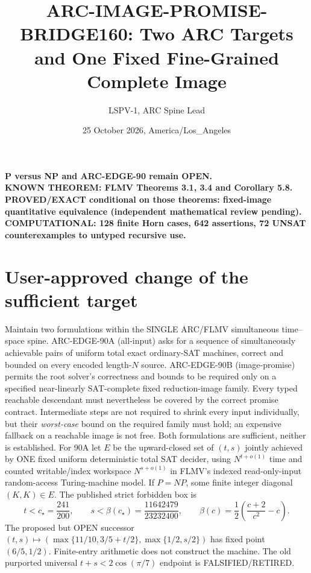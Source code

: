 \documentclass[11pt]{article}
\title{ARC-IMAGE-PROMISE-BRIDGE160: Two ARC Targets and One Fixed Fine-Grained Complete Image}
\author{LSPV-1, ARC Spine Lead}
\date{25 October 2026, America/Los\_Angeles}
\begin{document}
\maketitle
\begin{center}
\textbf{P versus NP and ARC-EDGE-90 remain OPEN.}\\
\textbf{KNOWN THEOREM: FLMV Theorems 3.1, 3.4 and Corollary 5.8.}\\
\textbf{PROVED/EXACT conditional on those theorems: fixed-image quantitative equivalence (independent mathematical review pending).}\\
\textbf{COMPUTATIONAL: 128 finite Horn cases, 642 assertions, 72 UNSAT counterexamples to untyped recursive use.}
\end{center}
\section{User-approved change of the sufficient target}
Maintain two formulations within the SINGLE ARC/FLMV simultaneous time--space spine. ARC-EDGE-90A (all-input) asks for a sequence of simultaneously achievable pairs of uniform total exact ordinary-SAT machines, correct and bounded on every encoded length-\(N\) source. ARC-EDGE-90B (image-promise) permits the root solver's correctness and bounds to be required only on a specified near-linearly SAT-complete fixed reduction-image family. Every typed reachable descendant must nevertheless be covered by the correct promise contract. Intermediate steps are not required to shrink every input individually, but their \emph{worst-case} bound on the required family must hold; an expensive fallback on a reachable image is not free. Both formulations are sufficient, neither is established.
For 90A let \(E\) be the upward-closed set of \((t,s)\) jointly achieved by ONE fixed uniform deterministic total SAT decider, using \(N^{t+o(1)}\) time and counted writable/index workspace \(N^{s+o(1)}\) in FLMV's indexed read-only-input random-access Turing-machine model. If \(P=NP\), some finite integer diagonal \((K,K)\in E\). The published strict forbidden box is
\[
t<c_\star=\frac{241}{200},\qquad
s<\beta(c_\star)=\frac{11642479}{23232400},\qquad
\beta(c)=\frac12\left(\frac{c+2}{c^2}-c\right).
\]
The proposed but OPEN successor \((t,s)\mapsto(\max\{11/10,3/5+t/2\},\max\{1/2,s/2\})\) has fixed point \((6/5,1/2)\). Finite-entry arithmetic does not construct the machine. The old purported universal \(t+s<2\cos(\pi/7)\) endpoint is FALSIFIED/RETIRED.
\end{document}
